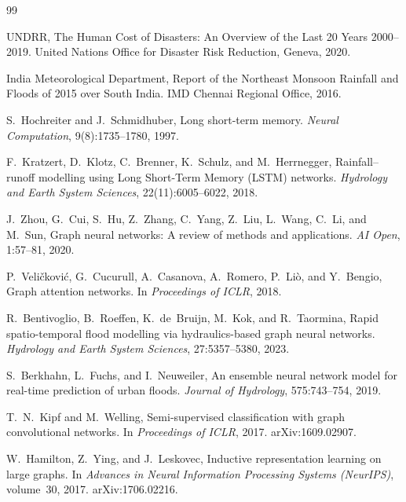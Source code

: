 \documentclass[10pt,twocolumn]{article}
\begin{document}
\begin{thebibliography}{99}

UNDRR,
\newblock The Human Cost of Disasters: An Overview of the Last 20 Years
  2000--2019.
\newblock United Nations Office for Disaster Risk Reduction, Geneva, 2020.

India Meteorological Department,
\newblock Report of the Northeast Monsoon Rainfall and Floods of 2015 over
  South India.
\newblock IMD Chennai Regional Office, 2016.

S.~Hochreiter and J.~Schmidhuber,
\newblock Long short-term memory.
\newblock \emph{Neural Computation}, 9(8):1735--1780, 1997.
\newblock {}

F.~Kratzert, D.~Klotz, C.~Brenner, K.~Schulz, and M.~Herrnegger,
\newblock Rainfall--runoff modelling using Long Short-Term Memory (LSTM)
  networks.
\newblock \emph{Hydrology and Earth System Sciences}, 22(11):6005--6022, 2018.
\newblock {}

J.~Zhou, G.~Cui, S.~Hu, Z.~Zhang, C.~Yang, Z.~Liu, L.~Wang, C.~Li, and
  M.~Sun,
\newblock Graph neural networks: A review of methods and applications.
\newblock \emph{AI Open}, 1:57--81, 2020.
\newblock {}

P.~Veli\v{c}kovi\'{c}, G.~Cucurull, A.~Casanova, A.~Romero, P.~Li\`{o}, and
  Y.~Bengio,
\newblock Graph attention networks.
\newblock In \emph{Proceedings of ICLR}, 2018.

R.~Bentivoglio, B.~Roeffen, K.~de~Bruijn, M.~Kok, and R.~Taormina,
\newblock Rapid spatio-temporal flood modelling via hydraulics-based graph
  neural networks.
\newblock \emph{Hydrology and Earth System Sciences}, 27:5357--5380, 2023.
\newblock {}

S.~Berkhahn, L.~Fuchs, and I.~Neuweiler,
\newblock An ensemble neural network model for real-time prediction of urban
  floods.
\newblock \emph{Journal of Hydrology}, 575:743--754, 2019.
\newblock {}

T.~N.~Kipf and M.~Welling,
\newblock Semi-supervised classification with graph convolutional networks.
\newblock In \emph{Proceedings of ICLR}, 2017.
\newblock arXiv:1609.02907.

W.~Hamilton, Z.~Ying, and J.~Leskovec,
\newblock Inductive representation learning on large graphs.
\newblock In \emph{Advances in Neural Information Processing Systems
  (NeurIPS)}, volume~30, 2017.
\newblock arXiv:1706.02216.


\end{thebibliography}
\end{document}
